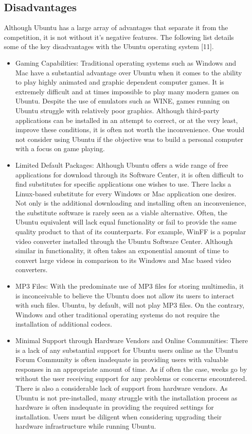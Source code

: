 \documentclass[11pt]{article}
\newcommand{\forceindent}{\leavevmode{\parindent=1em\indent}}
\begin{document}
\subsection{Disadvantages}
\forceindent Although Ubuntu has a large array of advantages that separate it from the competition, it is not without it's negative features. The following list details some of the key disadvantages with the Ubuntu operating system [11].
\begin{itemize}
\item Gaming Capabilities: Traditional operating systems such as Windows and Mac have a substantial advantage over Ubuntu when it comes to the ability to play highly animated and graphic dependent computer games. It is extremely difficult and at times impossible to play many modern games on Ubuntu. Despite the use of emulators such as WINE, games running on Ubuntu struggle with relatively poor graphics. Although third-party applications can be installed in an attempt to correct, or at the very least, improve these conditions, it is often not worth the inconvenience. One would not consider using Ubuntu if the objective was to build a personal computer with a focus on game playing. 
\item Limited Default Packages: Although Ubuntu offers a wide range of free applications for download through its Software Center, it is often difficult to find substitutes for specific applications one wishes to use. There lacks a Linux-based substitute for every Windows or Mac application one desires. Not only is the additional downloading and installing often an inconvenience, the substitute software is rarely seen as a viable alternative. Often, the Ubuntu equivalent will lack equal functionality or fail to provide the same quality product to that of its counterparts. For example, WinFF is a popular video converter installed through the Ubuntu Software Center. Although similar in functionality, it often takes an exponential amount of time to convert large videos in comparison to its Windows and Mac based video converters.
\item MP3 Files: With the predominate use of MP3 files for storing multimedia, it is inconceivable to believe the Ubuntu does not allow its users to interact with such files. Ubuntu, by default, will not play MP3 files. On the contrary, Windows and other traditional operating systems do not require the installation of additional codecs.
\item Minimal Support through Hardware Vendors and Online Communities:  There is a lack of any substantial support for Ubuntu users online as the Ubuntu Forum Community is often inadequate in providing users with valuable responses in an appropriate amount of time. As if often the case, weeks go by without the user receiving support for any problems or concerns encountered. There is also a considerable lack of support from hardware vendors. As Ubuntu is not pre-installed, many struggle with the installation process as hardware is often inadequate in providing the required settings for installation. Users must be diligent when considering upgrading their hardware infrastructure while running Ubuntu.
\end{itemize}
\end{document}
